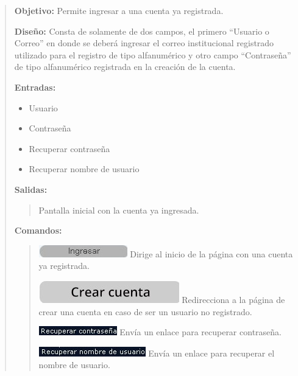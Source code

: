 \documentclass[14pt]{article}
\begin{document}
                \begin{quote}
                    \textbf{Objetivo:} Permite ingresar a una cuenta ya registrada.
                    
                    \textbf{Diseño:} Consta de solamente de dos campos, el primero “Usuario o Correo” en donde se deberá ingresar el correo institucional registrado utilizado para el registro de tipo alfanumérico y otro campo “Contraseña” de tipo alfanumérico registrada en la creación de la cuenta.
                    
                    \textbf{Entradas:} 
                        \begin{itemize}
                            \item Usuario
                            \item Contraseña
                            \item Recuperar contraseña
                            \item Recuperar nombre de usuario
                        \end{itemize}
                    
                    \textbf{Salidas:}
                        \begin{quote}
                            Pantalla inicial con la cuenta ya ingresada.
                        \end{quote}
                        
                    \textbf{Comandos:}
                        \begin{quote}
                            \includegraphics[height=0.02\textwidth]{BotonIngresar.png}
                            \label{P2:BotonIngresar} Dirige al inicio de la página con una cuenta ya registrada.
                            
                            \includegraphics[height=0.02\textwidth]{BotonCrearCuenta.jpg}
                            \label{P2:BotonCrearCuenta} Redirecciona a la página de crear una cuenta en caso de ser un usuario no registrado. 
                            
                            \includegraphics[height=0.02\textwidth]{BotonRecuperarCont.png}
                            \label{P2:BotonRecuperarCont} Envía un enlace para recuperar contraseña. 
                            
                            \includegraphics[height=0.02\textwidth]{BotonRecuperarNom.png}
                            \label{P2:BotonRecuperarNom} Envía un enlace para recuperar el nombre de usuario.
                        \end{quote} 
                \end{quote}
            
\end{document}
